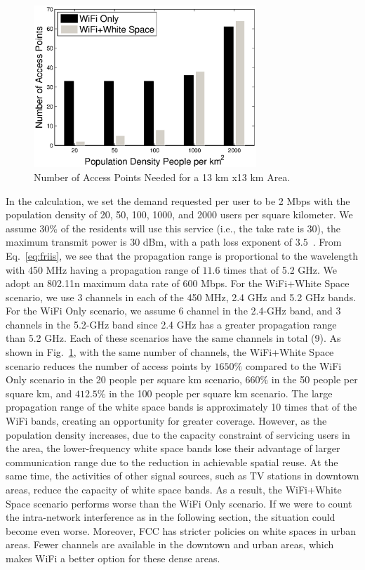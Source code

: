    \begin{figure}
   \centering
   \includegraphics[width=84mm]{figures/redensity}
   \vspace{-0.1in}
   \caption{Number of Access Points Needed for a 13 km x13 km Area.}
   \label{fig:redensity}
   \vspace{-0.3in}
   \end{figure}

In the calculation, we set the demand requested per user to be 2 Mbps with the population density of 20, 50, 100, 1000, 
and 2000 users per square kilometer. We assume 30\% of the residents will use this service (i.e., the take rate is 
30), the maximum transmit power is 30 dBm, with a path loss exponent of $3.5$~\cite{meikle2012global}. From Eq.~\ref{eq:friis}, 
we see that the propagation range is proportional to the wavelength with 450 MHz having a propagation 
range of $11.6$ times that of 5.2 GHz. We adopt an 802.11n maximum data rate of 600 Mbps. For the WiFi+White Space 
scenario, we use 3 channels in each of the 450 MHz, 2.4 GHz and 5.2 GHz bands. For the WiFi Only scenario, we assume 
6 channel in the 2.4-GHz band, and 3 channels in the 5.2-GHz band since 2.4 GHz has a greater propagation range than 5.2 GHz. 
Each of these scenarios have the same channels in total (9). As shown in Fig.~\ref{fig:redensity}, with the same number 
of channels, the WiFi+White Space scenario reduces the number of access points by $1650\%$ compared to the WiFi Only scenario in the 
20 people per square km scenario, $660\%$ in the 50 people per square km, and $412.5\%$ in the 100 people per square km 
scenario. The large propagation range of the white space bands is approximately 10 times that of the WiFi bands, creating 
an opportunity for greater coverage. However, as the population density increases, due to the capacity constraint of 
servicing users in the area, the lower-frequency white space bands lose their advantage of larger communication range due 
to the reduction in achievable spatial reuse. At the same time, the activities of other signal sources, such as TV stations 
in downtown areas, reduce the capacity of white space bands. As a result, the WiFi+White Space scenario performs worse 
than the WiFi Only scenario. If we were to count the intra-network interference as in the following section, the situation could become 
even worse. Moreover, FCC has stricter policies on white spaces in urban areas. Fewer channels are available in the 
downtown and urban areas, which makes WiFi a better option for these dense areas.

